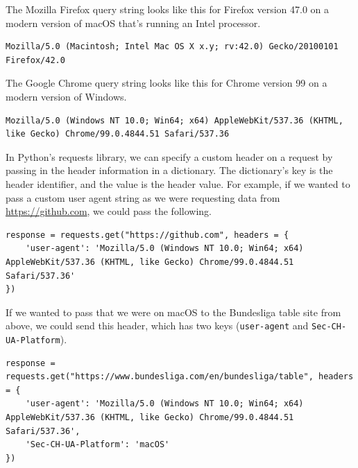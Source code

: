 The Mozilla Firefox query string looks like this for Firefox version 47.0 on a modern version of macOS that's running an Intel processor.\par
\begin{lstlisting}[style=none]
Mozilla/5.0 (Macintosh; Intel Mac OS X x.y; rv:42.0) Gecko/20100101 Firefox/42.0
\end{lstlisting}
The Google Chrome query string looks like this for Chrome version 99 on a modern version of Windows.\par
\begin{lstlisting}[style=none]
Mozilla/5.0 (Windows NT 10.0; Win64; x64) AppleWebKit/537.36 (KHTML, like Gecko) Chrome/99.0.4844.51 Safari/537.36
\end{lstlisting}
In Python's requests library, we can specify a custom header on a request by passing in the header information in a dictionary. The dictionary's key is the header identifier, and the value is the header value. For example, if we wanted to pass a custom user agent string as we were requesting data from \href{https://github.com}{https://github.com}, we could pass the following.\par
\begin{lstlisting}[style=pippython]
response = requests.get("https://github.com", headers = {
	'user-agent': 'Mozilla/5.0 (Windows NT 10.0; Win64; x64) AppleWebKit/537.36 (KHTML, like Gecko) Chrome/99.0.4844.51 Safari/537.36'
})
\end{lstlisting}
If we wanted to pass that we were on macOS to the Bundesliga table site from above, we could send this header, which has two keys (\verb|user-agent| and \verb|Sec-CH-UA-Platform|).
\begin{lstlisting}[style=pippython]
response = requests.get("https://www.bundesliga.com/en/bundesliga/table", headers = {
	'user-agent': 'Mozilla/5.0 (Windows NT 10.0; Win64; x64) AppleWebKit/537.36 (KHTML, like Gecko) Chrome/99.0.4844.51 Safari/537.36',
	'Sec-CH-UA-Platform': 'macOS'
})
\end{lstlisting}

